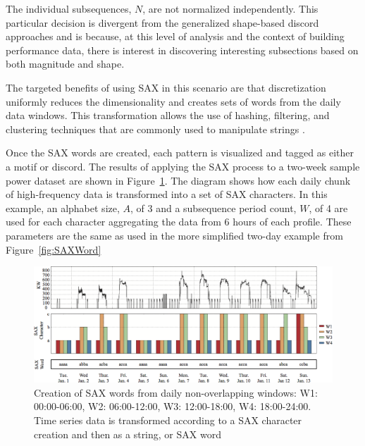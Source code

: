 The individual subsequences, $N$, are not normalized independently. This particular decision is divergent from the generalized shape-based discord approaches and is because, at this level of analysis and the context of building performance data, there is interest in discovering interesting subsections based on both magnitude and shape. 

The targeted benefits of using SAX in this scenario are that discretization uniformly reduces the dimensionality and creates sets of words from the daily data windows. This transformation allows the use of hashing, filtering, and clustering techniques that are commonly used to manipulate strings \citep{lin_experiencing_2007}. 

Once the SAX words are created, each pattern is visualized and tagged as either a motif or discord. The results of applying the SAX process to a two-week sample power dataset are shown in Figure~\ref{fig:saxcreation}. The diagram shows how each daily chunk of high-frequency data is transformed into a set of SAX characters. In this example, an alphabet size, $A$, of 3 and a subsequence period count, $W$, of 4 are used for each character aggregating the data from 6 hours of each profile. These parameters are the same as used in the more simplified two-day example from Figure~\ref{fig:SAXWord}

\begin{figure}[ht!]
\begin{center}
\includegraphics[width=1\columnwidth]{figures/SAXWordExample_BarLine/SAXWordExample_BarLine}
\caption{Creation of SAX words from daily non-overlapping windows: W1: 00:00-06:00, W2: 06:00-12:00, W3: 12:00-18:00, W4: 18:00-24:00. Time series data is transformed according to a SAX character creation and then as a string, or SAX word \citep{miller_automated_2015}
\label{fig:saxcreation}%
}
\end{center}
\end{figure}


